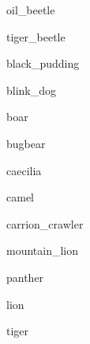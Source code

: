 \documentclass[letterpaper,serif]{module}
\begin{document}
\begin{newmonster}{oil_beetle}\end{newmonster}

\begin{newmonster}{tiger_beetle}\end{newmonster}

\begin{newmonster}{black_pudding}\end{newmonster}

\begin{newmonster}{blink_dog}\end{newmonster}

\begin{newmonster}{boar}\end{newmonster}

\begin{newmonster}{bugbear}\end{newmonster}

\begin{newmonster}{caecilia}\end{newmonster}

\begin{newmonster}{camel}\end{newmonster}

\begin{newmonster}{carrion_crawler}\end{newmonster}


\begin{newmonster}{mountain_lion}\end{newmonster}

\begin{newmonster}{panther}\end{newmonster}

\begin{newmonster}{lion}\end{newmonster}

\begin{newmonster}{tiger}\end{newmonster}
\end{document}
